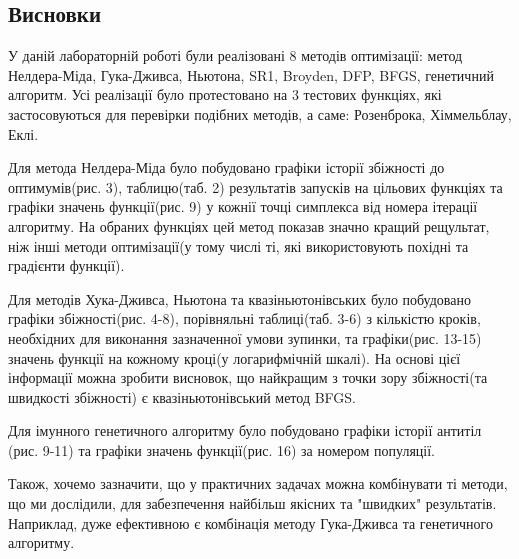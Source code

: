 \begin{center}
    \section*{Висновки}
\end{center}

У даній лабораторній роботі були реалізовані
$8$ методів оптимізації: метод Нелдера-Міда,
Гука-Дживса, Ньютона, SR1, Broyden, DFP, BFGS, генетичний алгоритм.
Усі реалізації було протестовано на $3$ тестових функціях,
які застосовуються для перевірки подібних методів,
а саме: Розенброка, Хіммельблау, Еклі.

Для метода Нелдера-Міда було побудовано графіки
історії збіжності до оптимумів(рис. 3), таблицю(таб. 2) результатів
запусків на цільових функціях та графіки значень функції(рис. 9) у кожнії точці
симплекса від номера ітерації алгоритму.
На обраних функціях цей метод показав значно кращий
рещультат, ніж інші методи оптимізації(у тому числі ті, які
використовують похідні та градієнти функції).

Для методів Хука-Дживса, Ньютона та квазіньютонівських було побудовано графіки
збіжності(рис. 4-8), порівняльні таблиці(таб. 3-6) з кількістю кроків,
необхідних для виконання зазначенної умови зупинки, та
графіки(рис. 13-15) значень функції на кожному кроці(у логарифмічній шкалі).
На основі цієї інформації можна зробити висновок, що
найкращим з точки зору збіжності(та швидкості збіжності) є
квазіньютонівський метод BFGS.

Для імунного генетичного алгоритму
було побудовано графіки історії антитіл (рис. 9-11) та
графіки значень функції(рис. 16) за номером популяції.

Також, хочемо зазначити, що у практичних задачах
можна комбінувати ті методи, що ми дослідили, для забезпечення
найбільш якісних та "швидких" результатів. Наприклад, дуже
ефективною є комбінація методу Гука-Дживса та генетичного алгоритму.
